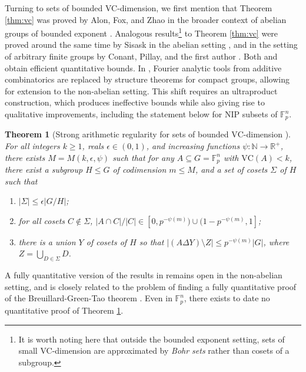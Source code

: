 \documentclass[12pt,oneside,british,a4wide]{amsart}
\newtheorem{theorem}{Theorem}[section]
\numberwithin{equation}{section}
\theoremstyle{definition}
\def\F{\mathbb{F}}
\def\VC{\mathrm{VC}}
\def\e{\epsilon}
\begin{document}
Turning to sets of bounded VC-dimension, we first mention that  Theorem \ref{thm:vc} was proved by  Alon, Fox, and Zhao in the broader context of abelian groups of bounded exponent \cite{Alon.2018is}.  Analogous results\footnote{It is worth noting here that outside the bounded exponent setting, sets of small VC-dimension are approximated by \emph{Bohr sets} rather than cosets of a subgroup.} to Theorem \ref{thm:vc} were proved around the same time by Sisask in the abelian setting \cite{Sisask.2018}, and in the setting of arbitrary finite groups by Conant, Pillay, and the first author \cite{Conant.2018zd}.  Both \cite{Alon.2018is} and \cite{Sisask.2018} obtain efficient quantitative bounds.  In \cite{Conant.2018zd}, Fourier analytic tools from additive combinatorics are replaced by structure theorems for compact groups, allowing for extension to the non-abelian setting. This shift requires an ultraproduct construction, which produces ineffective bounds while also giving rise to qualitative improvements, including the statement below for NIP subsets of $\F_p^n$.

\begin{theorem}[Strong arithmetic regularity for sets of bounded $\VC$-dimension \cite{Conant.2018zd}]\label{thm:vcstrong}
For all integers $k\geq 1$, reals $\e\in (0,1)$,  and increasing functions $\psi:\mathbb{N}\rightarrow \mathbb{R}^+$,  there exists $M=M(k,\e,\psi)$ such that for any $A\subseteq G=\F_p^n$ with $\VC(A)<k$, there exist  a subgroup $H\leqslant  G$ of codimension $m\leq M$, and a set of cosets $\Sigma$ of $H$ such that 
\begin{enumerate}[label=\normalfont(\roman*)] 
\item $|\Sigma|\leq \e |G/H|$; 
\item for all cosets $C\notin \Sigma$, $|A\cap C|/|C|\in [0,p^{-\psi(m)})\cup (1-p^{-\psi(m)},1]$; 
\item there is a union $Y$ of cosets of $H$ so that $|(A\Delta Y)\setminus Z|\leq p^{-\psi(m)}|G|$, where $Z=\bigcup_{D\in \Sigma}D$.   
\end{enumerate}
\end{theorem}

 A fully quantitative version of the results in \cite{Conant.2018zd} remains open in the non-abelian setting, and is closely related to the problem of finding a fully quantitative proof of the Breuillard-Green-Tao theorem \cite{BGT}.  Even in $\F_p^n$, there exists to date no quantitative proof of  Theorem \ref{thm:vcstrong}.  
\end{document}
